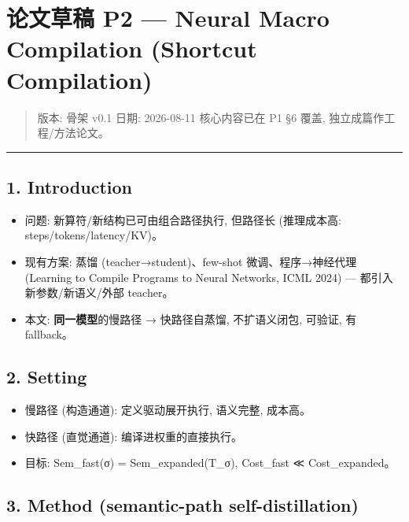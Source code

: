 \documentclass[
]{article}
\author{}
\date{}
\providecommand{\tightlist}{%
  \setlength{\itemsep}{0pt}\setlength{\parskip}{0pt}}
\begin{document}
\section{论文草稿 P2 --- Neural Macro Compilation (Shortcut
Compilation)}\label{ux8bbaux6587ux8349ux7a3f-p2-neural-macro-compilation-shortcut-compilation}

\begin{quote}
版本: 骨架 v0.1 \textbar{} 日期: 2026-08-11 \textbar{} 核心内容已在 P1
§6 覆盖, 独立成篇作工程/方法论文。
\end{quote}

\begin{center}\rule{0.5\linewidth}{0.5pt}\end{center}

\subsection{1. Introduction}\label{introduction}

\begin{itemize}
\tightlist
\item
  问题: 新算符/新结构已可由组合路径执行, 但路径长 (推理成本高:
  steps/tokens/latency/KV)。
\item
  现有方案: 蒸馏 (teacher→student)、few-shot 微调、程序→神经代理
  (Learning to Compile Programs to Neural Networks, ICML 2024) ---
  都引入新参数/新语义/外部 teacher。
\item
  本文: \textbf{同一模型}的慢路径 → 快路径自蒸馏, 不扩语义闭包, 可验证,
  有 fallback。
\end{itemize}

\subsection{2. Setting}\label{setting}

\begin{itemize}
\tightlist
\item
  慢路径 (构造通道): 定义驱动展开执行, 语义完整, 成本高。
\item
  快路径 (直觉通道): 编译进权重的直接执行。
\item
  目标: Sem\_fast(σ) = Sem\_expanded(T\_σ), Cost\_fast ≪
  Cost\_expanded。
\end{itemize}

\subsection{3. Method (semantic-path
self-distillation)}\label{method-semantic-path-self-distillation}
\end{document}
